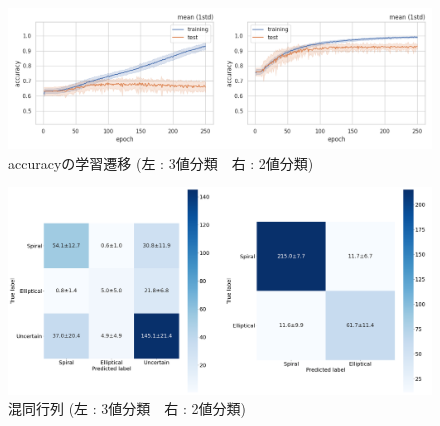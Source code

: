 \documentclass[a4j, 11pt]{jreport}
\begin{document}
\begin{figure}[H]
  \centering
  \includegraphics[width=1\hsize, keepaspectratio]{images/drawio/4_2_accs.png}
  \caption{accuracyの学習遷移 (左 : 3値分類　右 : 2値分類)}
  \label{fig:4_2_accs}
\end{figure}

\begin{figure}[H]
  \centering
  \includegraphics[width=1\hsize, keepaspectratio]{images/drawio/4_2_cms.png}
  \caption{混同行列 (左 : 3値分類　右 : 2値分類)}
  \label{fig:4_2_cms}
\end{figure}


\end{document}
